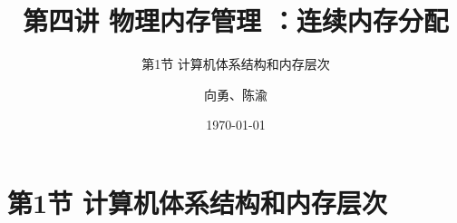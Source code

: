 


\title[第4讲]{第四讲 物理内存管理 ：连续内存分配} %
\subtitle{第1节 计算机体系结构和内存层次}
\author{向勇、陈渝} %
\date{\today} %



\begin{frame}
\titlepage %
\end{frame}


\section{第1节 计算机体系结构和内存层次}%
